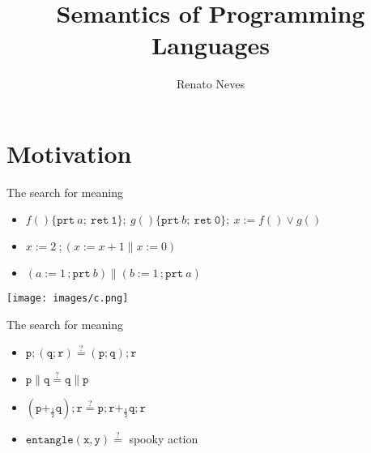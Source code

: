 \documentclass{beamer}
\author[Renato Neves]{Renato Neves}
\date{}
\begin{document}
\title{Semantics of Programming Languages}

\frame[plain]{\titlepage}
\section{Motivation}
\begin{frame}{ The search for meaning }

  \begin{examples}
    \begin{itemize}
            \item $f()\{ \mathtt{prt}\ a; \> \mathtt{ret \ 1} \} ;\
                g()\{ \mathtt{prt}\ b; \> \mathtt{ret \ 0} \};\
                x:= f() \vee g()$
                \\[10pt]
            \item $x:=2\ ; (x := x + 1 \parallel  x := 0)$ 
                \\[10pt]
            \item $(a:= 1\, ; \mathtt{prt}\ b) \parallel 
                    (b:= 1\, ; \mathtt{prt}\ a)$ 
    \end{itemize}
  \end{examples}

  \vfill
  \pause
  \centering 
  \texttt{[image: images/c.png]}
\end{frame}

\begin{frame}{ The search for meaning }
    \begin{examples}
    \begin{itemize}
            \item $\mathtt{p ; (q ; r)} \stackrel{?}{=} \mathtt{(p ; q) ; r} $
                    \\[10pt]
            \item $\mathtt{p \parallel q \stackrel{?}{=} q \parallel p} $ 
                    \\[10pt]
            \item $\mathtt{\left (p +_{\frac{1}{2}} q \right ) ; r 
                    \stackrel{?}{=} p ; r +_{\frac{1}{2}} q ; r}$ 
                    \\[10pt]
            \item $\mathtt{entangle(x,y) \stackrel{?}{=}}$ spooky action 
    \end{itemize}
  \end{examples}

  \pause
  \center
\end{frame}
\end{document}
